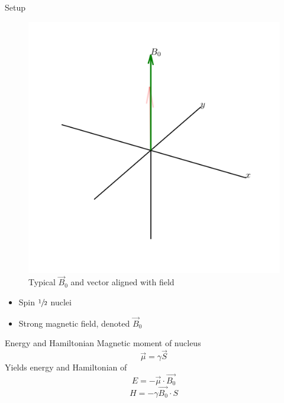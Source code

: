 \documentclass[aspectratio=169,xcolor=dvipsnames]{beamer}
\newcommand{\half}{$\sfrac{1}{2}$ }
\newcommand{\Bnot}{\vec{B}_0}
\begin{document}
\begin{frame}{Setup}
    

    \begin{minipage}{0.4\linewidth}
        \begin{figure}
            \centering
            \includegraphics[width = \linewidth]{setup.png}
            \caption{Typical $\Bnot$ and vector aligned with field}
        \end{figure}
    \end{minipage}
    \hfill
    \begin{minipage}{0.5\linewidth}
        \begin{itemize}
            \item Spin \half nuclei 
            \item Strong magnetic field, denoted $\Bnot$
        \end{itemize}
        \begin{block}{Energy and Hamiltonian}
            Magnetic moment of nucleus
            \begin{equation}
                \vec{\mu} = \gamma \vec{S}
            \end{equation}
            Yields energy and Hamiltonian of 
            \begin{equation}
                E = -\vec{\mu} \cdot \vec{B_0}
            \end{equation}
            \begin{equation}\label{eqn:base-hamiltonian}
                H = -\gamma \vec{B_0} \cdot S
            \end{equation}
        \end{block}
    \end{minipage}
    

\end{frame}
\end{document}
